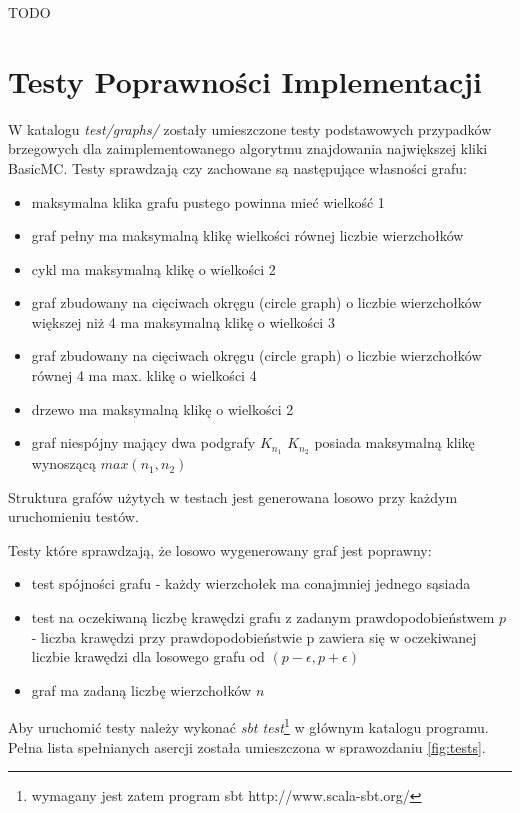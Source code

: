 \documentclass[12pt, a4paper]{article}
\begin{document}
TODO

\section{Testy Poprawności Implementacji}

W katalogu \textit{test/graphs/} zostały umieszczone testy podstawowych przypadków brzegowych dla zaimplementowanego algorytmu znajdowania największej kliki BasicMC.
Testy sprawdzają czy zachowane są następujące własności grafu:
\begin{itemize}
  \item maksymalna klika grafu pustego powinna mieć wielkość 1
  \item graf pełny ma maksymalną klikę wielkości równej liczbie wierzchołków
  \item cykl ma maksymalną klikę o wielkości 2
  \item graf zbudowany na cięciwach okręgu (circle graph) o liczbie wierzchołków większej niż 4 ma maksymalną klikę o wielkości 3
  \item graf zbudowany na cięciwach okręgu (circle graph) o liczbie wierzchołków równej 4 ma max. klikę o wielkości 4
  \item drzewo ma maksymalną klikę o wielkości 2
  \item graf niespójny mający dwa podgrafy $K_{n_{1}}$ $K_{n_{2}}$ posiada maksymalną klikę wynoszącą $max(n_{1}, n_{2})$
\end{itemize}

Struktura grafów użytych w testach jest generowana losowo przy każdym uruchomieniu testów.

Testy które sprawdzają, że losowo wygenerowany graf jest poprawny:
\begin{itemize}
  \item test spójności grafu - każdy wierzchołek ma conajmniej jednego sąsiada
  \item test na oczekiwaną liczbę krawędzi grafu z zadanym prawdopodobieństwem $p$ - liczba krawędzi przy prawdopodobieństwie p zawiera się w oczekiwanej liczbie krawędzi dla losowego grafu od $(p - \epsilon, p + \epsilon)$
  \item graf ma zadaną liczbę wierzchołków $n$
\end{itemize}

Aby uruchomić testy należy wykonać \textit{sbt test}\footnote{wymagany jest zatem program sbt http://www.scala-sbt.org/} w głównym katalogu programu. Pełna lista spełnianych asercji została umieszczona w sprawozdaniu \ref{fig:tests}.
\end{document}
